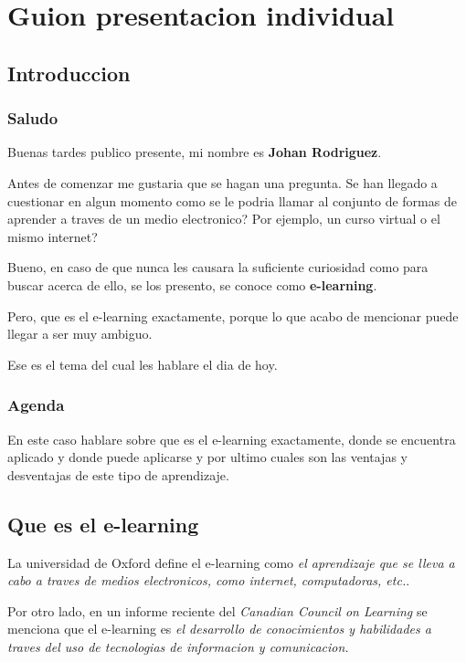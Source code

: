 \chapter{Guion presentacion individual}

\section{Introduccion}

\subsection{Saludo}

Buenas tardes publico presente, mi nombre es \textbf{Johan Rodriguez}.

Antes de comenzar me gustaria que se hagan una pregunta. Se han llegado 
a cuestionar en algun momento como se le podria llamar al conjunto de formas de 
aprender a traves de un medio electronico? Por ejemplo, un curso 
virtual o el mismo internet?

Bueno, en caso de que nunca les causara la suficiente curiosidad como para 
buscar acerca de ello, se los presento, se conoce como \textbf{e-learning}.

Pero, que es el e-learning exactamente, porque lo que acabo de mencionar 
puede llegar a ser muy ambiguo.

Ese es el tema del cual les hablare el dia de hoy.

\subsection{Agenda}

En este caso hablare sobre que es el e-learning exactamente, donde se 
encuentra aplicado y donde puede aplicarse y por ultimo cuales son las 
ventajas y desventajas de este tipo de aprendizaje.

\section{Que es el e-learning}

La universidad de Oxford define el e-learning como \textit{el aprendizaje
que se lleva a cabo a traves de medios electronicos, como internet,
computadoras, etc.}. 

Por otro lado, en un informe reciente del \textit{Canadian Council on Learning}
se menciona que el e-learning es \textit{el desarrollo de conocimientos y
habilidades a traves del uso de tecnologias de informacion y comunicacion.}

